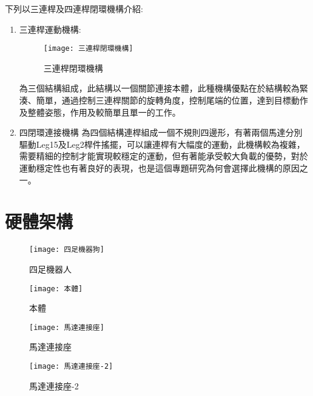 下列以三連桿及四連桿閉環機構介紹:\\
\begin{enumerate}
\item 三連桿運動機構:
\begin{figure}[hbt!]
\begin{center}
\texttt{[image: 三連桿閉環機構]}
\caption{\Large 三連桿閉環機構}\label{三連桿閉環機構}
\end{center}
\end{figure}
為三個結構組成，此結構以一個關節連接本體，此種機構優點在於結構較為緊湊、簡單，通過控制三連桿關節的旋轉角度，控制尾端的位置，達到目標動作及整體姿態，作用及較簡單且單一的工作。\\
\item 四閉環連接機構
為四個結構連桿組成一個不規則四邊形，有著兩個馬達分別驅動Leg15及Leg2桿件搖擺，可以讓連桿有大幅度的運動，此機構較為複雜，需要精細的控制才能實現較穩定的運動，但有著能承受較大負載的優勢，對於運動穩定性也有著良好的表現，也是這個專題研究為何會選擇此機構的原因之一。
\end{enumerate}
\newpage

\section{硬體架構}

\begin{figure}[hbt!]
\begin{center}
\texttt{[image: 四足機器狗]}
\caption{\Large 四足機器人}\label{四足機器狗}
\end{center}
\end{figure}
\newpage

\begin{figure}[htbp]
  \begin{minipage}[t]{0.3\linewidth}
    \centering
    \texttt{[image: 本體]}
    \caption{本體}
    \label{本體}
  \end{minipage}
  \hfill
  \begin{minipage}[t]{0.3\linewidth}
    \centering
    \texttt{[image: 馬達連接座]}
    \caption{馬達連接座}
    \label{馬達連接座}
  \end{minipage}
  \hfill
  \begin{minipage}[t]{0.3\linewidth}
    \centering
    \texttt{[image: 馬達連接座-2]}
    \caption{馬達連接座-2}
    \label{馬達連接座-2}
  \end{minipage}
\end{figure}


